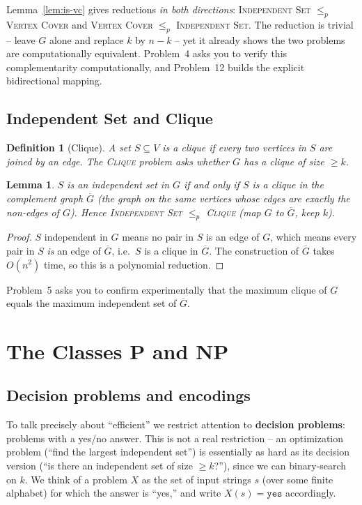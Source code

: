\documentclass[11pt]{article}
\newtheorem{lemma}[theorem]{Lemma}
\newtheorem{definition}[theorem]{Definition}
\begin{document}
Lemma~\ref{lem:is-vc} gives reductions \emph{in both directions}: \textsc{Independent Set}
$\le_p$ \textsc{Vertex Cover} and \textsc{Vertex Cover} $\le_p$ \textsc{Independent Set}.
The reduction is trivial -- leave $G$ alone and replace $k$ by $n - k$ -- yet it already
shows the two problems are computationally equivalent. Problem~4 asks you to verify this
complementarity computationally, and Problem~12 builds the explicit bidirectional mapping.

\subsection{Independent Set and Clique}

\begin{definition}[Clique]
A set $S \subseteq V$ is a \emph{clique} if every two vertices in $S$ are joined by an
edge. The \textsc{Clique} problem asks whether $G$ has a clique of size $\ge k$.
\end{definition}

\begin{lemma}
\label{lem:is-clique}
$S$ is an independent set in $G$ if and only if $S$ is a clique in the \emph{complement}
graph $\overline{G}$ (the graph on the same vertices whose edges are exactly the
\emph{non-edges} of $G$). Hence \textsc{Independent Set} $\le_p$ \textsc{Clique} (map $G$
to $\overline{G}$, keep $k$).
\end{lemma}

\begin{proof}
$S$ independent in $G$ means no pair in $S$ is an edge of $G$, which means every pair in
$S$ \emph{is} an edge of $\overline{G}$, i.e.\ $S$ is a clique in $\overline{G}$. The
construction of $\overline{G}$ takes $O(n^2)$ time, so this is a polynomial reduction.
\end{proof}

Problem~5 asks you to confirm experimentally that the maximum clique of $G$ equals the
maximum independent set of $\overline{G}$.

\section{The Classes P and NP}

\subsection{Decision problems and encodings}

To talk precisely about ``efficient'' we restrict attention to \textbf{decision problems}:
problems with a yes/no answer. This is not a real restriction -- an optimization problem
(``find the largest independent set'') is essentially as hard as its decision version
(``is there an independent set of size $\ge k$?''), since we can binary-search on $k$. We
think of a problem $X$ as the set of input strings $s$ (over some finite alphabet) for
which the answer is ``yes,'' and write $X(s) = \mathtt{yes}$ accordingly.
\end{document}
